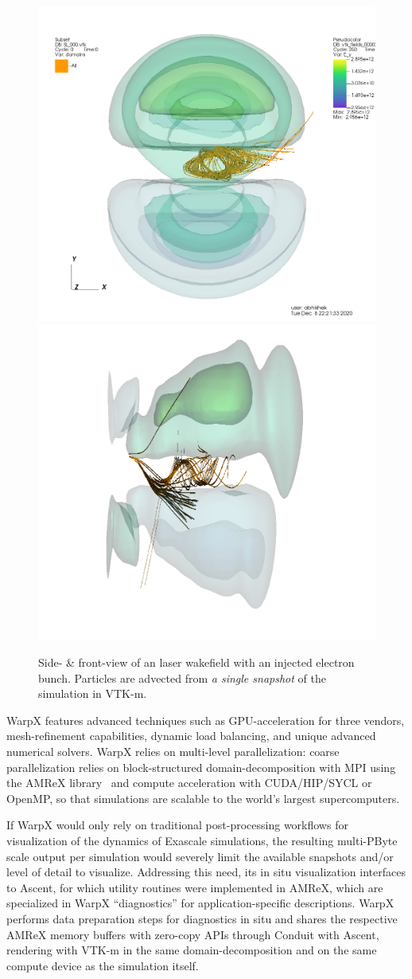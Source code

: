 \begin{figure}[ht]
  \centering
  \includegraphics[width=0.49\linewidth]{figures/lwfa_particle_advection_front.png}%
  \includegraphics[width=0.49\linewidth]{figures/lwfa_particle_advection_side.png}
  \caption{Side- \& front-view of an laser wakefield with an injected electron bunch.
  Particles are advected from \emph{a single snapshot} of the simulation in VTK-m.}
  \label{fig:lwfa_particle_advection}
\end{figure}

WarpX features advanced techniques such as GPU-acceleration for three vendors, mesh-refinement capabilities, dynamic load balancing, and unique advanced numerical solvers.
WarpX relies on multi-level parallelization: coarse parallelization relies on block-structured domain-decomposition with MPI using the AMReX library~\cite{Zhang2019} and compute acceleration with CUDA/HIP/SYCL or OpenMP, so that simulations are scalable to the world's largest supercomputers.

If WarpX would only rely on traditional post-processing workflows for visualization of the dynamics of Exascale simulations, the resulting multi-PByte scale output per simulation would severely limit the available snapshots and/or level of detail to visualize.
Addressing this need, its in situ visualization interfaces to Ascent, for which utility routines were implemented in AMReX, which are specialized in WarpX ``diagnostics'' for application-specific descriptions.
WarpX performs data preparation steps for diagnostics in situ and shares the respective AMReX memory buffers with zero-copy APIs through Conduit with Ascent, rendering with VTK-m in the same domain-decomposition and on the same compute device as the simulation itself.

